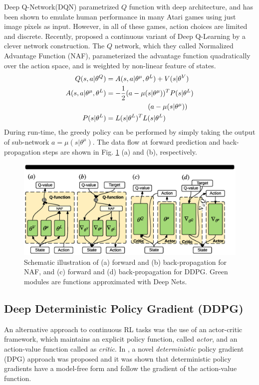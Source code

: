 \documentclass[../thesis.tex]{subfiles}
\begin{document}
Deep Q-Network(DQN) parametrized $Q$ function with deep architecture\cite{mnih2013playing}, and has been shown to emulate human performance \cite{mnih2015human} in many Atari games using just image pixels as input. However, in all of these games, action choices are limited and discrete. Recently, \citet{CDQN} proposed a continuous variant of Deep Q-Learning by a clever network construction. The $Q$ network, which they called Normalized Advantage Function (NAF), parameterized the advantage function quadratically over the action space, and is weighted by non-linear feature of states. 
\begin{align}
\centering
Q(s,a|\theta^Q) &= A(s,a | \theta^\mu, \theta^L) + V(s|\theta^V) \\
A(s,a | \theta^\mu, \theta^L) &= -\frac{1}{2}(a-\mu(s|\theta^\mu))^T P(s|\theta^L)\nonumber \\
&\qquad \qquad \qquad(a-\mu(s|\theta^\mu)) \label{equ:NAF} \\
P(s|\theta^L) &= L(s|\theta^L)^TL(s|\theta^L) \label{equ:P}
\end{align}
During run-time, the greedy policy can be performed by simply taking the output of sub-network $a = \mu(s|\theta^\mu)$. The data flow at forward prediction and back-propagation steps are shown in Fig. \ref{fig:CDQN-DDPG} (a) and (b), respectively.

\begin{figure}[t]
	\begin{center}
	\centerline{\includegraphics[width=0.8\columnwidth,trim= 80 900 110 70, clip=true]{./MultimodalDRL/fig/naf_ddpg}}
	\caption{Schematic illustration of (a) forward and (b) back-propagation for NAF, and (c) forward and (d) back-propagation for DDPG. Green modules are functions approximated with Deep Nets.}
	\label{fig:CDQN-DDPG}
	\end{center}
\end{figure} 

\subsection{Deep Deterministic Policy Gradient (DDPG)}
An alternative approach to continuous RL tasks was the use of an actor-critic framework, which maintains an explicit policy function, called \textit{actor}, and an action-value function called as \textit{critic}. In \citet{dpg}, a novel \emph{deterministic} policy gradient (DPG) approach was proposed and it was shown that deterministic policy gradients have a model-free form and follow the gradient of the action-value function. 
\end{document}
